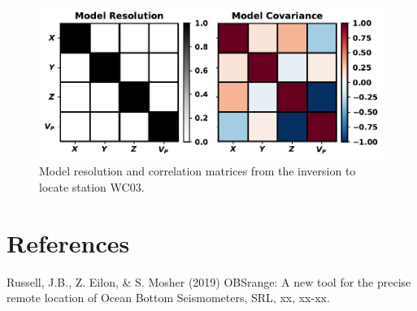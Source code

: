 \documentclass[titlepage, 12pt]{article}
\begin{document}
  \begin{figure}[!htb]
   \centering
   \includegraphics[width=0.9\linewidth]{resolution_matrices.pdf}
   \caption{Model resolution and correlation matrices from the inversion to locate station WC03.}
  \end{figure}

 \section*{References}
  Russell, J.B., Z. Eilon, \& S. Mosher (2019) OBSrange: A new tool for the precise remote location of Ocean Bottom Seismometers, SRL, xx, xx-xx.
\end{document}
